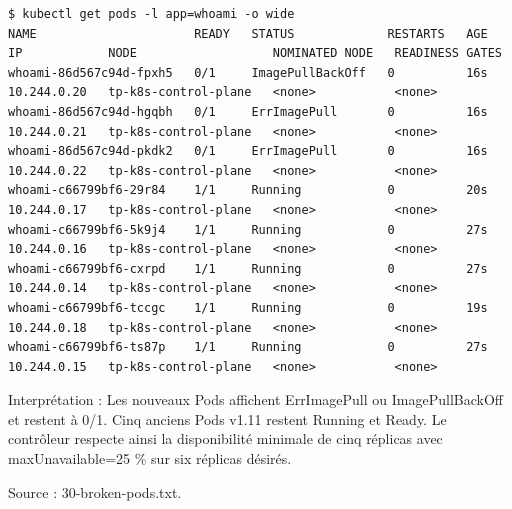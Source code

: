 \documentclass[11pt,a4paper]{article}
\begin{document}
\par\medskip\noindent\begin{minipage}{\linewidth}
\par\vspace{4pt}\noindent\begin{minipage}{\linewidth}
\begin{Verbatim}[breaklines=true,breakanywhere=true,fontsize=\footnotesize,frame=single,framesep=8pt,rulecolor=\color{teal}]
$ kubectl get pods -l app=whoami -o wide
NAME                      READY   STATUS             RESTARTS   AGE   IP            NODE                   NOMINATED NODE   READINESS GATES
whoami-86d567c94d-fpxh5   0/1     ImagePullBackOff   0          16s   10.244.0.20   tp-k8s-control-plane   <none>           <none>
whoami-86d567c94d-hgqbh   0/1     ErrImagePull       0          16s   10.244.0.21   tp-k8s-control-plane   <none>           <none>
whoami-86d567c94d-pkdk2   0/1     ErrImagePull       0          16s   10.244.0.22   tp-k8s-control-plane   <none>           <none>
whoami-c66799bf6-29r84    1/1     Running            0          20s   10.244.0.17   tp-k8s-control-plane   <none>           <none>
whoami-c66799bf6-5k9j4    1/1     Running            0          27s   10.244.0.16   tp-k8s-control-plane   <none>           <none>
whoami-c66799bf6-cxrpd    1/1     Running            0          27s   10.244.0.14   tp-k8s-control-plane   <none>           <none>
whoami-c66799bf6-tccgc    1/1     Running            0          19s   10.244.0.18   tp-k8s-control-plane   <none>           <none>
whoami-c66799bf6-ts87p    1/1     Running            0          27s   10.244.0.15   tp-k8s-control-plane   <none>           <none>
\end{Verbatim}
\end{minipage}\par\vspace{6pt}

Interprétation : Les nouveaux Pods affichent ErrImagePull ou ImagePullBackOff et restent à 0/1. Cinq anciens Pods v1.11 restent Running et Ready. Le contrôleur respecte ainsi la disponibilité minimale de cinq réplicas avec maxUnavailable=25 \% sur six réplicas désirés.

{\footnotesize\color{teal} Source : 30-broken-pods.txt.\par}
\end{minipage}\par\medskip
\end{document}
